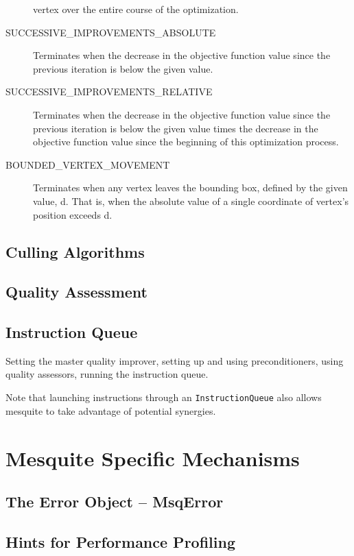 \begin{description}
vertex over the entire course of the optimization. 
\item[SUCCESSIVE\_\-IMPROVEMENTS\_\-ABSOLUTE] Terminates when the decrease in the objective function
value since the previous iteration is below the given value.
\item[SUCCESSIVE\_\-IMPROVEMENTS\_\-RELATIVE] Terminates when the decrease in the objective function
value since the previous iteration is below the given value times the decrease in the objective
function value since the beginning of this optimization process. 
\item[BOUNDED\_\-VERTEX\_\-MOVEMENT] Terminates when any vertex leaves the bounding box, defined by the given value, d. That is, when
the absolute value of a single coordinate of vertex's position exceeds d. 
\end{description}


\subsection{Culling Algorithms}

\subsection{Quality Assessment}

\subsection{Instruction Queue}
Setting the master quality improver, setting up and using preconditioners,
using quality assessors, running the instruction queue.

Note that launching instructions through an \texttt{InstructionQueue} also allows mesquite to take
advantage of potential synergies. 


\section{Mesquite Specific Mechanisms}

\subsection{The Error Object -- MsqError}
\label{sec:MsqError}

\subsection{Hints for Performance Profiling}

